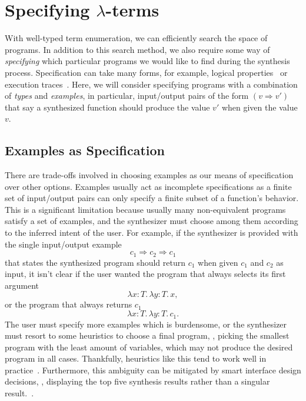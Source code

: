\section{Specifying \texorpdfstring{$λ$}{λ}-terms}
\label{sec:specifying-lambda-terms}

With well-typed term enumeration, we can efficiently search the space of \stlc{} programs.
In addition to this search method, we also require some way of \emph{specifying} which particular programs we would like to find during the synthesis process.
Specification can take many forms, for example, logical properties~ or execution traces~.
Here, we will consider specifying programs with a combination of \emph{types} and \emph{examples}, in particular, input/output pairs of the form $(v ⇒ v')$ that say a synthesized function should produce the value $v'$ when given the value $v$.

\subsection{Examples as Specification}
\label{subsec:examples-as-specification}

There are trade-offs involved in choosing examples as our means of specification over other options.
Examples usually act as incomplete specifications as a finite set of input/output pairs can only specify a finite subset of a function's behavior.
This is a significant limitation because usually many non-equivalent programs satisfy a set of examples, and the synthesizer must choose among them according to the inferred intent of the user.
For example, if the synthesizer is provided with the single input/output example
\[
  c_1 ⇒ c_2 ⇒ c_1
\]
that states the synthesized program should return $c_1$ when given $c_1$ and $c_2$ as input, it isn't clear if the user wanted the program that always selects its first argument
\[
  λx{:}T.\,λy{:}T.\,x,
\]
or the program that always returns $c_1$
\[
  λx{:}T.\,λy{:}T.\,c_1.
\]
The user must specify more examples which is burdensome, or the synthesizer must resort to some heuristics to choose a final program, \eg, picking the smallest program with the least amount of variables, which may not produce the desired program in all cases.
Thankfully, heuristics like this tend to work well in practice~.
Furthermore, this ambiguity can be mitigated by smart interface design decisions, \eg, displaying the top five synthesis results rather than a singular result.~.

